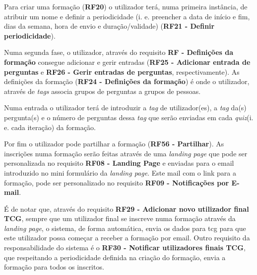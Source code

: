 Para criar uma formação (\textbf{RF20}) o utilizador terá, numa primeira instância, de atribuir um nome e definir a periodicidade (i. e. preencher a data de início e fim, dias da semana, hora de envio e  duração/validade) (\textbf{RF21 - Definir periodicidade}). 

Numa segunda fase, o utilizador, através do requisito \textbf{RF - Definições da formação} consegue adicionar e gerir entradas (\textbf{RF25 - Adicionar entrada de perguntas} e \textbf{RF26 - Gerir entradas de perguntas}, respectivamente). As definições da formação (\textbf{RF24 - Definições da formação}) é onde o utilizador, através de \textit{tags} associa grupos de perguntas a grupos de pessoas. 

Numa entrada o utilizador terá de introduzir a \textit{tag} de utilizador(es), a \textit{tag} da(s) pergunta(s) e o número de perguntas dessa \textit{tag} que serão enviadas em cada \textit{quiz}(i. e. cada iteração) da formação.

Por fim o utilizador pode partilhar a formação (\textbf{RF56 - Partilhar}). As inscrições numa formação serão feitas através de uma \textit{landing page} que pode ser personalizada no requisito \textbf{RF08 - Landing Page} e enviadas para o email introduzido no mini formulário da \textit{landing page}. Este mail com o link para a formação, pode ser personalizado no requisito \textbf{RF09 - Notificações por E-mail}. 

É de notar que, através do requisito \textbf{RF29 - Adicionar novo utilizador final TCG}, sempre que um utilizador final se inscreve numa formação através da \textit{landing page}, o sistema, de forma automática, envia os dados para \acrshort{tcg} para que este utilizador possa começar a receber a formação por email. Outro requisito da responsabilidade do sistema é o \textbf{RF30 - Notificar utilizadores finais TCG}, que respeitando a periodicidade definida na criação do formação, envia a formação para todos os inscritos.



